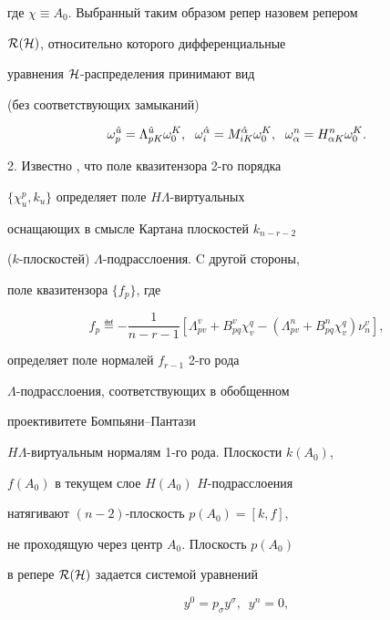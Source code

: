 где $\chi \equiv A_0$. Выбранный таким образом репер назовем репером


$\cal R(\cal H)$, относительно которого дифференциальные


уравнения $\cal H$-распределения принимают вид


(без соответствующих замыканий)


$$


\omega^{\Hat u}_p = \Lambda^{\Hat u}_{p K} \omega^K_0,\ \;


\omega^{\Hat \alpha}_i = M^{\Hat \alpha}_{i K} \omega^K_0,\ \;


\omega^n_\alpha = H^n_{\alpha K} \omega^K_0.


$$





2. Известно \cite{rab3}, что поле квазитензора 2-го порядка


$\{ \chi^p_u, k_u\}$ определяет поле $H\Lambda$-вир\-ту\-аль\-ных


оснащающих в смысле Картана плоскостей $k_{n-r-2}$


($k$-плоскостей) $\Lambda$-подрасслоения. C другой стороны,


поле квазитензора $\{ f_p\}$, где


$$


f_p \eqdef -\frac1{n-r-1}


[ \Lambda^v_{pv} + B^v_{pq} \chi^q_v -


(\Lambda^n_{pv} + B^n_{pq} \chi^q_v) \nu^v_n ],


$$


определяет поле нормалей $f_{r-1}$ 2-го рода


$\Lambda$-подрасслоения, соответствующих в обобщенном


проективитете Бом\-пья\-ни--Пантази \cite{rab4}


$H\Lambda$-виртуальным нормалям 1-го рода. Плоскости $k(A_0)$,


$f(A_0)$ в текущем слое $H(A_0)$\; $H$-подрасслоения


натягивают $(n-2)$-плоскость $p(A_0)=[k,f]$,


не проходящую через центр $A_0$. Плоскость $p(A_0)$


в репере $\cal R(\cal H)$ задается системой уравнений


\begin{equation}


y^0=p_\sigma y^\sigma,\ \; y^n=0,


\end{equation}



